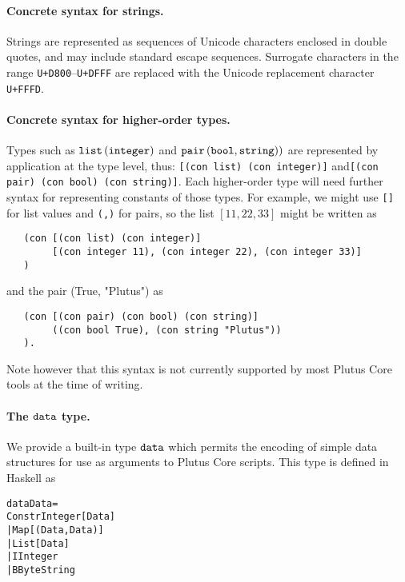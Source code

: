 \paragraph{Concrete syntax for strings.} Strings are represented as sequences of Unicode characters
enclosed in double quotes, and may include standard escape sequences.  Surrogate
characters in the range \texttt{U+D800}--\texttt{U+DFFF} are replaced with the
Unicode replacement character \texttt{U+FFFD}.


\paragraph{Concrete syntax for higher-order types.} Types such as $\mathtt{list}\,\mathtt{(}\mathtt{integer}\mathtt{)}$
and $\mathtt{pair}\,\mathtt{(}\mathtt{bool}\mathtt{,}\,\mathtt{string)}\mathtt{)}$ are represented by application at the
type level, thus: \texttt{[(con list) (con integer)]} and\texttt{[(con pair)
    (con bool) (con string)]}.  Each higher-order type will need further syntax
for representing constants of those types.  For example, we might use
\texttt{[]} for list values and \texttt{(,)} for pairs, so the list $[11,22,33]$
might be written as
\begin{verbatim}
   (con [(con list) (con integer)] 
        [(con integer 11), (con integer 22), (con integer 33)]
   )
\end{verbatim}
and the pair (True, "Plutus") as
\begin{verbatim}
   (con [(con pair) (con bool) (con string)] 
        ((con bool True), (con string "Plutus"))
   ).
\end{verbatim}
Note however that this syntax is not currently supported by most Plutus Core tools at the time of writing.



\paragraph{The $\mathtt{data}$ type.}
We provide a built-in type $\mathtt{data}$ which permits the encoding of simple data structures
for use as arguments to Plutus Core scripts.  This type is defined in Haskell as 
\begin{alltt}
   data Data =
      Constr Integer [Data]
      | Map [(Data, Data)]
      | List [Data]
      | I Integer
      | B ByteString
\end{alltt}

